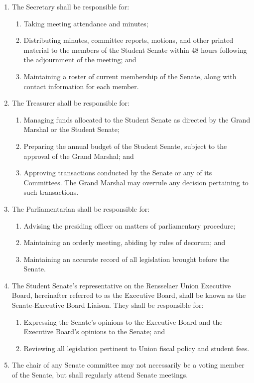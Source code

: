 \begin{enumerate}
\item The Secretary shall be responsible for:
\begin{enumerate}
\item Taking meeting attendance and minutes;
\item Distributing minutes, committee reports, motions, and other printed material to the members of the Student Senate within 48 hours following the adjournment of the meeting; and
\item Maintaining a roster of current membership of the Senate, along with contact information for each member.
\end{enumerate}

\item The Treasurer shall be responsible for:
\begin{enumerate}
\item Managing funds allocated to the Student Senate as directed by the Grand Marshal or the Student Senate;
\item Preparing the annual budget of the Student Senate, subject to the approval of the Grand Marshal; and
\item Approving transactions conducted by the Senate or any of its Committees. The Grand Marshal may overrule any decision
pertaining to such transactions.
\end{enumerate}

\item The Parliamentarian shall be responsible for:
\begin{enumerate}
\item Advising the presiding officer on matters of parliamentary procedure;
\item Maintaining an orderly meeting, abiding by rules of decorum; and
\item Maintaining an accurate record of all legislation brought before the Senate.
\end{enumerate}

\item The Student Senate’s representative on the Rensselaer Union Executive Board, hereinafter referred to as the Executive Board, shall be known as the Senate-Executive Board Liaison. They shall be responsible for:
\begin{enumerate}
\item Expressing the Senate’s opinions to the Executive Board and the Executive Board’s opinions to the Senate; and
\item Reviewing all legislation pertinent to Union fiscal policy and student fees.
\end{enumerate}

\item The chair of any Senate committee may not necessarily be a voting member of the Senate, but shall regularly attend Senate meetings.

\end{enumerate}

